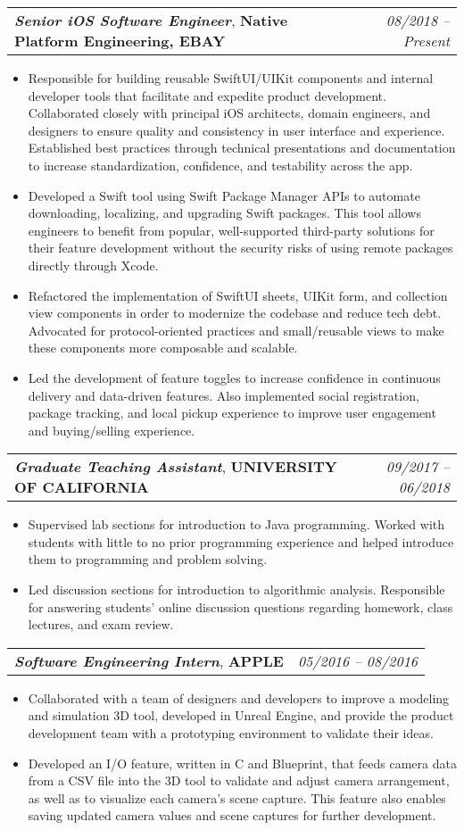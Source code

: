 \documentclass[letterpaper,11pt]{article}
\makeatletter
\newcommand{\resumeItem}[1]{
  \item \small{#1}
}
\newcommand{\resumeExperienceSubheading}[3]{
  \vspace{-1pt}\item
    \begin{tabular*}{0.97\textwidth}[t]{l@{\extracolsep{\fill}}r}
      \textbf{\textit{#1}}, \textbf{#2} & \textit{#3} \\
    \end{tabular*}\vspace{-5pt}
}
\newcommand{\resumeItemListStart}{\begin{itemize}}
\newcommand{\resumeItemListEnd}{\end{itemize}\vspace{-5pt}}
\def\CPlusPlus{{C\nolinebreak[4]\hspace{-.05em}\raisebox{.4ex}{\tiny\bf ++}}}
\makeatother
\begin{document}
    \resumeExperienceSubheading
      {Senior iOS Software Engineer}{Native Platform Engineering, EBAY}{08/2018 -- Present}
      \resumeItemListStart
        \resumeItem
          {Responsible for building reusable SwiftUI/UIKit components and internal developer tools 
          that facilitate and expedite product development. Collaborated closely with principal iOS architects, domain engineers, and designers to ensure
          quality and consistency in user interface and experience. Established best practices through technical presentations 
          and documentation to increase standardization, confidence, and testability across the app.}
        \resumeItem
          {Developed a Swift tool using Swift Package Manager APIs to automate downloading, localizing, and upgrading Swift packages. 
          This tool allows engineers to benefit from popular, well-supported third-party solutions 
          for their feature development without the security risks of using remote packages directly through Xcode.}
        \resumeItem
          {Refactored the implementation of SwiftUI sheets, UIKit form, and collection view components
          in order to modernize the codebase and reduce tech debt. Advocated for protocol-oriented practices and 
          small/reusable views to make these components more composable and scalable.}
        \resumeItem
          {Led the development of feature toggles to increase confidence in continuous delivery and data-driven features. 
          Also implemented social registration, package tracking, and local pickup experience to improve user engagement and 
          buying/selling experience.}
      \resumeItemListEnd

    \resumeExperienceSubheading
      {Graduate Teaching Assistant}{UNIVERSITY OF CALIFORNIA}{09/2017 -- 06/2018}
      \resumeItemListStart
        \resumeItem
          {Supervised lab sections for introduction to Java programming. Worked with students with little to no prior programming
          experience and helped introduce them to programming and problem solving.}
        \resumeItem
          {Led discussion sections for introduction to algorithmic analysis. Responsible for answering students' online discussion
          questions regarding homework, class lectures, and exam review.}
      \resumeItemListEnd

      \resumeExperienceSubheading
      {Software Engineering Intern}{APPLE}{05/2016 -- 08/2016}
      \resumeItemListStart
        \resumeItem
          {Collaborated with a team of designers and developers to improve a modeling and simulation 3D tool, developed in
          Unreal Engine, and provide the product development team with a prototyping environment to validate their ideas.}
        \resumeItem
          {Developed an I/O feature, written in {\CPlusPlus} and Blueprint, that feeds camera data from a CSV file into the 3D tool to
          validate and adjust camera arrangement, as well as to visualize each camera's scene capture. This feature also enables saving
          updated camera values and scene captures for further development.}
      \resumeItemListEnd
\end{document}
